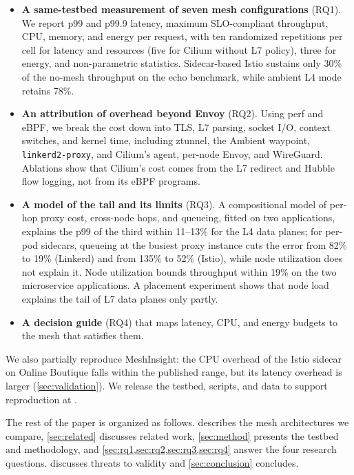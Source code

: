 \begin{itemize}
  \item \textbf{A same-testbed measurement of seven mesh configurations}
        (RQ1). We report p99 and p99.9 latency, maximum SLO-compliant
        throughput, CPU, memory, and energy per request, with ten randomized
        repetitions per cell for latency and resources (five for Cilium
        without L7 policy), three for energy, and
        non-parametric statistics. Sidecar-based
        Istio sustains only 30\% of the no-mesh throughput on the echo
        benchmark, while ambient L4 mode retains 78\%.
  \item \textbf{An attribution of overhead beyond Envoy} (RQ2). Using perf and
        eBPF, we break the cost down into TLS, L7 parsing, socket I/O, context
        switches, and kernel time, including ztunnel, the Ambient waypoint,
        \texttt{linkerd2-proxy}, and Cilium's agent, per-node Envoy, and
        WireGuard. Ablations show that Cilium's cost comes from the L7
        redirect and Hubble flow logging, not from its eBPF programs.
  \item \textbf{A model of the tail and its limits} (RQ3). A compositional
        model of per-hop proxy cost, cross-node hops, and queueing, fitted on
        two applications, explains the p99 of the third within 11--13\% for
        the L4 data planes; for per-pod sidecars, queueing at the busiest
        proxy instance cuts the error from 82\% to 19\% (Linkerd) and from
        135\% to 52\% (Istio), while node utilization does not explain it.
        Node utilization bounds throughput within 19\% on the two
        microservice applications. A placement experiment shows that node
        load explains the tail of L7 data planes only partly.
  \item \textbf{A decision guide} (RQ4) that maps latency, CPU, and energy
        budgets to the mesh that satisfies them.
\end{itemize}

We also partially reproduce MeshInsight: the CPU overhead of the Istio
sidecar on Online Boutique falls within the published range, but its latency
overhead is larger (\cref{sec:validation}). We release the testbed, scripts, and data to
support reproduction at \anonrepo.

The rest of the paper is organized as follows.  describes
the mesh architectures we compare, \cref{sec:related} discusses related work,
\cref{sec:method} presents the testbed and methodology, and
\cref{sec:rq1,sec:rq2,sec:rq3,sec:rq4} answer the four research questions.
 discusses threats to validity and \cref{sec:conclusion}
concludes.
